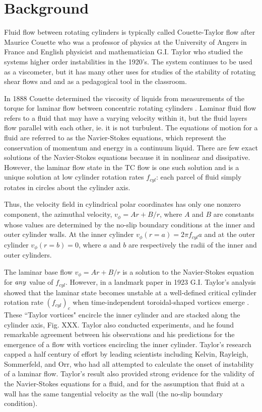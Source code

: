 \documentclass[%
 amsmath,amssymb,
 aps,
floatfix,
aps,prd,longbibliography,
notitlepage
]{revtex4-1}
\begin{document}
\section {Background}
Fluid flow between rotating cylinders is typically called  Couette-Taylor flow after Maurice Couette who was a professor of physics at the University of Angers in France and English physicist and mathematician G.I. Taylor who studied the systems higher order instabilities in the 1920's\cite{couette_taylor}.  The system continues to be used as a viscometer, but it has many other uses for studies of the stability of rotating shear flows and and as a pedagogical tool in the classroom.

In 1888 Couette determined the viscosity of liquids from measurements of the torque for laminar flow between concentric rotating cylinders \cite{couette}. Laminar fluid flow refers to a fluid that may have a varying velocity within it, but the fluid layers flow parallel with each other, ie. it is not turbulent. The equations of motion for a fluid are referred to as the Navier-Stokes equations, which represent the conservation of momentum and energy in a continuum liquid. There are few exact solutions of the Navier-Stokes equations because it in nonlinear and dissipative. However, the laminar flow state in the TC flow is one such solution and is a unique solution at low cylinder rotation rates $f_{cyl}$: each parcel of fluid simply rotates in circles about the cylinder axis. 
 
 Thus, the velocity field in cylindrical polar coordinates has only one nonzero component, the azimuthal velocity, $v_\phi = Ar + B/r$, where $A$ and $B$ are constants whose values are determined by the no-slip boundary conditions at the inner and outer cylinder walls. At the inner cylinder $v_\phi(r=a)= 2\pi f_{cyl}a$  and at the outer cylinder $v_{\phi}(r=b) = 0$, where $a$ and $b$ are respectively the radii of the inner and outer cylinders.

The laminar base flow $v_\phi = Ar + B/r$ is a solution to the Navier-Stokes equation for $\it any$ value of $f_{cyl}$. However, in a landmark paper in 1923 G.I. Taylor's analysis showed that the laminar state becomes unstable at a well-defined critical cylinder rotation rate $(f_{cyl})_c$ when time-independent toroidal-shaped vortices emerge \cite{Taylor}. These ``Taylor vortices" encircle the inner cylinder and are stacked along the cylinder axis, Fig. XXX.  Taylor also conducted experiments, and he found remarkable agreement between his observations and his predictions for the emergence of a flow with vortices encircling the inner cylinder.  Taylor's research capped a half century of effort by leading scientists including Kelvin, Rayleigh, Sommerfeld, and Orr, who had all attempted to calculate the onset of instability of a laminar flow.  Taylor's result also provided strong evidence for the validity of the Navier-Stokes equations for a fluid, and for the assumption that fluid at a wall has the same tangential velocity as the wall (the no-slip boundary condition).  
\end{document}

